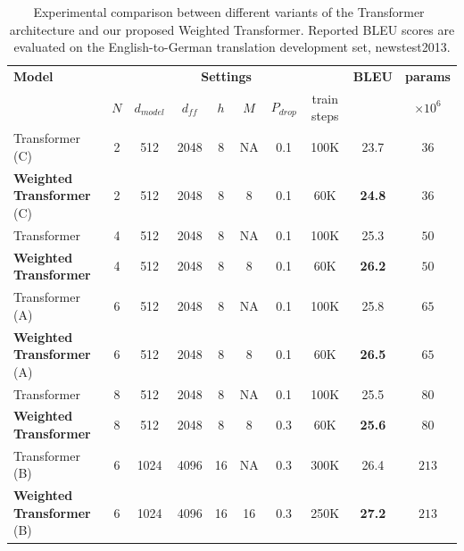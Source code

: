 \documentclass{article} %
\newcommand{\name}{Weighted Transformer\xspace}
\begin{document}
\begin{table}
{\small
\center
\begin{tabular}{lccccccccc}
\toprule
\bf Model &  \multicolumn{7}{c}{\bf Settings} & \bf BLEU & \bf params \\
\cmidrule(lr){2-8} 
& $N$ & $d_{model}$ & $d_{ff}$ & $h$ & $M$  & $P_{drop}$ & train steps & & $\times10^{6}$ \\
\midrule


Transformer (C) & 2 & 512 & 2048 & 8 & NA &  0.1 & 100K & 23.7 & $36$  \\
\textbf{\name} (C) & 2 & 512 & 2048 & 8 & 8 &  0.1 & 60K & \textbf{24.8} & $36$  \\
\midrule

Transformer& 4 & 512 & 2048 & 8 & NA &  0.1 & 100K & 25.3 & $50$  \\
\textbf{\name}& 4 & 512 & 2048 & 8 & 8 &  0.1 & 60K & \textbf{26.2} & $50$  \\
\midrule

Transformer (A)& 6 & 512 & 2048 & 8 & NA &  0.1 & 100K & 25.8 & $65$  \\
\textbf{\name} (A)& 6 & 512 & 2048 & 8 & 8  & 0.1 & 60K & \textbf{26.5} & $65$  \\
\midrule

Transformer& 8 & 512 & 2048 & 8 & NA & 0.1 & 100K & 25.5 & $80$  \\
\textbf{\name}& 8 & 512 & 2048 & 8 & 8 &  0.3 & 60K & \textbf{25.6} & $80$  \\
\midrule
\midrule


Transformer (B)& 6 & 1024 & 4096 & 16 & NA &  0.3 & 300K & 26.4 & $213$  \\
\textbf{\name} (B)& 6 & 1024 & 4096 & 16 & 16 &  0.3 & 250K & \textbf{27.2} & $213$  \\


\bottomrule
\end{tabular}
\caption{Experimental comparison between different variants of the Transformer~\citep{vaswani2017attention} architecture and our proposed \name. Reported BLEU scores are evaluated on the English-to-German translation development set, newstest2013.}
\label{table:model_variations}
}
\end{table}
\end{document}
